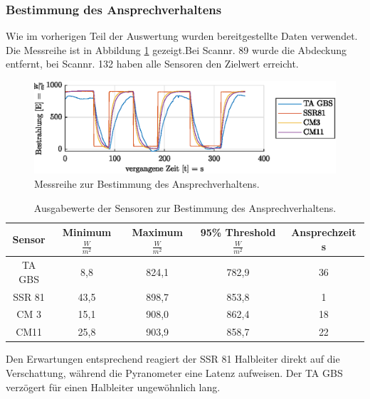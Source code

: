 \subsubsection{Bestimmung des Ansprechverhaltens}
Wie im vorherigen Teil der Auswertung wurden bereitgestellte Daten verwendet. Die Messreihe ist in Abbildung \ref{fig:response} gezeigt.Bei Scannr. 89 wurde die Abdeckung entfernt, bei Scannr. 132 haben alle Sensoren den Zielwert erreicht.
\begin{figure}[H]
	\centering
	\includegraphics[width=\textwidth]{../DATA/Messreihe_Ansprechzeit.eps}
	\caption[Messreihe zur Bestimmung des Ansprechverhaltens.]{Messreihe zur Bestimmung des Ansprechverhaltens.}
	\label{fig:response}
\end{figure}

\begin{table}[H]
\centering
\caption{Ausgabewerte der Sensoren zur Bestimmung des Ansprechverhaltens.}
	\begin{tabular}{c c c c c}
		\label{tab:response}
		
		\textbf{Sensor} & \textbf{Minimum} $\frac{W}{m^2}$ & \textbf{Maximum} $\frac{W}{m^2}$& \textbf{95\% Threshold} $\frac{W}{m^2}$ & \textbf{Ansprechzeit} s\\
		\hline
		TA GBS & 8,8 & 824,1 & 782,9 & 36 \\
		SSR 81 & 43,5 & 898,7 & 853,8 & 1 \\
		CM 3 & 15,1 & 908,0 & 862,4 & 18 \\
		CM11 & 25,8 & 903,9 & 858,7 & 22 \\
	\end{tabular}
\end{table}
Den Erwartungen entsprechend reagiert der SSR 81 Halbleiter direkt auf die Verschattung, während die Pyranometer eine Latenz aufweisen. Der TA GBS verzögert für einen Halbleiter ungewöhnlich lang.

